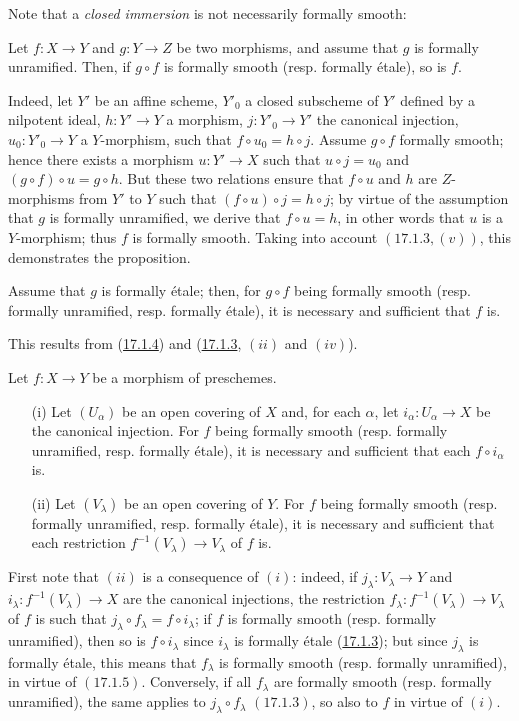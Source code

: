 Note that a \emph{closed immersion} is not necessarily formally smooth:
\begin{proposition}[17.1.4]
\label{IV.17.1.4}
	Let $f: X \to Y$ and $g: Y \to Z$ be two morphisms, and assume that $g$ is formally unramified. Then, if $g \circ f$ is formally smooth (resp. formally \'etale), so is $f$.
\end{proposition}
Indeed, let $Y'$ be an affine scheme, $Y'_0$ a closed subscheme of $Y'$ defined by a nilpotent ideal, $h: Y' \to Y$ a morphism, $j: Y'_0 \to Y'$ the canonical injection, $u_0: Y'_0 \to Y$ a $Y$-morphism, such that $f \circ u_0 = h \circ j$. Assume $g \circ f$ formally smooth; hence there exists a morphism $u : Y' \to X$ such that $u \circ j = u_0$ and $(g\circ f) \circ u = g \circ h$. But these two relations ensure that $f \circ u$ and $h$ are $Z$-morphisms from $Y'$ to $Y$ such that $(f\circ u)\circ j = h \circ j$; by virtue of the assumption that $g$ is formally unramified, we derive that $f \circ u = h$, in other words that $u$ is a $Y$-morphism; thus $f$ is formally smooth. Taking into account $(\hyperref[IV.17.1.3]{17.1.3}, (v))$, this demonstrates the proposition.
\begin{corollary}[17.1.5]
\label{IV.17.1.5}
	Assume that $g$ is formally \'etale; then, for $g \circ f$ being formally smooth (resp. formally unramified, resp. formally \'etale), it is necessary and sufficient that $f$ is.
\end{corollary}	
This results from (\hyperref[IV.17.1.4]{17.1.4}) and (\hyperref[IV.17.1.3]{17.1.3}, $(ii)$ and $(iv)$).
\begin{proposition}[17.1.6]
\label{IV.17.1.6}
Let $f:X\to Y$ be a morphism of preschemes.
\begin{enumerate}
	\item[(i)] Let $(U_\alpha)$ be an open covering of $X$ and, for each $\alpha$, let $i_\alpha: U_\alpha \to X$ be the canonical injection. For $f$ being formally smooth (resp. formally unramified, resp. formally \'etale), it is necessary and sufficient that each $f \circ i_\alpha$ is.
	\item[(ii)] Let $(V_\lambda)$ be an open covering of $Y$. For $f$ being formally smooth (resp. formally unramified, resp. formally \'etale), it is necessary and sufficient that each restriction $f^{-1}(V_\lambda) \to V_\lambda$ of $f$ is.
\end{enumerate}
\end{proposition}	
First note that $(ii)$ is a consequence of $(i)$: indeed, if $j_\lambda: V_\lambda \to Y$ and $i_\lambda: f^{-1}(V_\lambda) \to X$ are the canonical injections, the restriction $f_\lambda : f^{-1}(V_\lambda) \to V_\lambda$ of $f$ is such that $j_\lambda \circ f_\lambda = f \circ i_\lambda$; if $f$ is formally smooth (resp. formally unramified), then so is $f \circ i_\lambda$ since $i_\lambda$ is formally \'etale (\hyperref[IV.17.1.3]{17.1.3}); but since $j_\lambda$ is formally \'etale, this means that $f_\lambda$ is formally smooth (resp. formally unramified), in virtue of $(\hyperref[IV.17.1.5]{17.1.5})$. Conversely, if all $f_\lambda$ are formally smooth (resp. formally unramified), the same applies to $j_\lambda \circ f_\lambda$ $(\hyperref[IV.17.1.3]{17.1.3})$, so also to $f$ in virtue of $(i)$.\\

